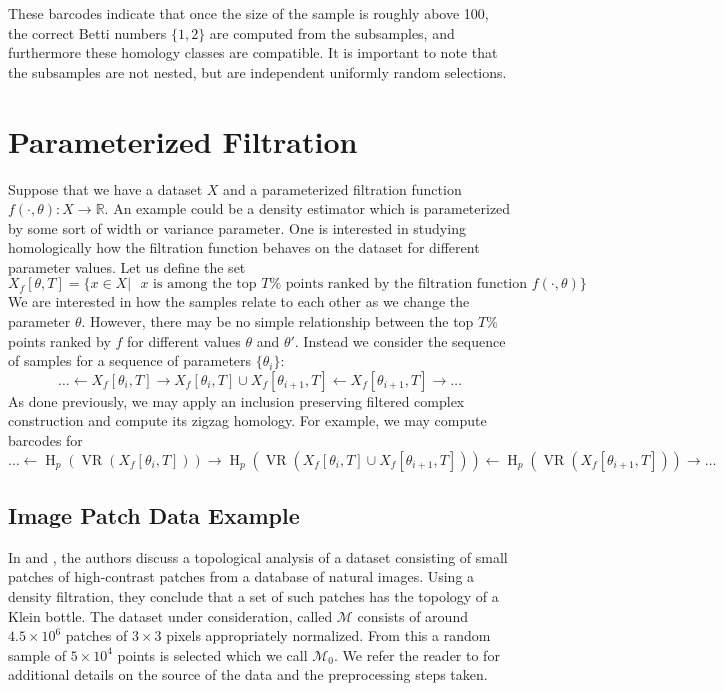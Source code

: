 \documentclass[10pt]{amsart}
\newcommand{\VR}{\operatorname{VR}}
\newcommand{\Ho}{\operatorname{H}}
\begin{document}
These barcodes indicate that once the size of the sample is roughly above 100, the correct Betti numbers $\{1, 2\}$ are computed from the subsamples, and furthermore these homology classes are compatible. It is important to note that the subsamples are not nested, but are independent uniformly random selections.

\section{Parameterized Filtration}

Suppose that we have a dataset $X$ and a parameterized filtration function $f(\cdot, \theta):X \rightarrow \mathbb{R}$. An example could be a density estimator which is parameterized by some sort of width or variance parameter. One is interested in studying homologically how the filtration function behaves on the dataset for different parameter values. Let us define the set
$$X_f[\theta, T] = \{x \in X | \mbox{ $x$ is among the top $T\%$ points ranked by the filtration function $f(\cdot, \theta)$}\}$$
We are interested in how the samples relate to each other as we change the parameter $\theta$. However, there may be no simple relationship between the top $T\%$ points ranked by $f$ for different values $\theta$ and $\theta'$. Instead we consider the sequence of samples for a sequence of parameters $\{\theta_i\}$:
$$\ldots \leftarrow X_f[\theta_i, T] \rightarrow X_f[\theta_i, T] \cup X_f[\theta_{i+1}, T] \leftarrow X_f[\theta_{i+1}, T] \rightarrow \ldots$$
As done previously, we may apply an inclusion preserving filtered complex construction and compute its zigzag homology. For example, we may compute barcodes for
$$\ldots \leftarrow \Ho_p(\VR(X_f[\theta_i, T])) \rightarrow \Ho_p(\VR(X_f[\theta_i, T] \cup X_f[\theta_{i+1}, T])) \leftarrow \Ho_p(\VR(X_f[\theta_{i+1}, T])) \rightarrow \ldots$$


\subsection{Image Patch Data Example}

In \cite{Images} and \cite{Carlsson_09}, the authors discuss a topological analysis of a dataset consisting of small patches of high-contrast patches from a database of natural images. Using a density filtration, they conclude that a set of such patches has the topology of a Klein bottle. The dataset under consideration, called $\mathcal{M}$ consists of around $4.5 \times 10^6$ patches of $3 \times 3$ pixels appropriately normalized. From this a random sample of $5 \times 10^4$ points is selected which we call $\mathcal{M}_0$. We refer the reader to \cite{Lee} for additional details on the source of the data and the preprocessing steps taken.
\end{document}

